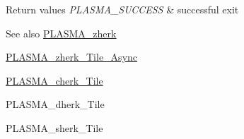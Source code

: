 \begin{DoxyRetVals}{Return values}
{\em P\+L\+A\+S\+M\+A\+\_\+\+S\+U\+C\+C\+E\+S\+S} & successful exit\\
\hline
\end{DoxyRetVals}
\begin{DoxySeeAlso}{See also}
\hyperlink{group__PLASMA__Complex64__t_ga37897923ff4fb613bbd5a69a58b12fb8_ga37897923ff4fb613bbd5a69a58b12fb8}{P\+L\+A\+S\+M\+A\+\_\+zherk} 

\hyperlink{group__PLASMA__Complex64__t__Tile__Async_ga1b230b4886af07679f6b0788d00df24c_ga1b230b4886af07679f6b0788d00df24c}{P\+L\+A\+S\+M\+A\+\_\+zherk\+\_\+\+Tile\+\_\+\+Async} 

\hyperlink{group__PLASMA__Complex32__t__Tile_ga1f31a0502f57ea6dc05fd7ad5aaed0e3_ga1f31a0502f57ea6dc05fd7ad5aaed0e3}{P\+L\+A\+S\+M\+A\+\_\+cherk\+\_\+\+Tile} 

P\+L\+A\+S\+M\+A\+\_\+dherk\+\_\+\+Tile 

P\+L\+A\+S\+M\+A\+\_\+sherk\+\_\+\+Tile 
\end{DoxySeeAlso}
\hypertarget{group__PLASMA__Complex64__t__Tile_gafced4fe39f5fa98ab1c9b8d857e2b7c4_gafced4fe39f5fa98ab1c9b8d857e2b7c4}{}
